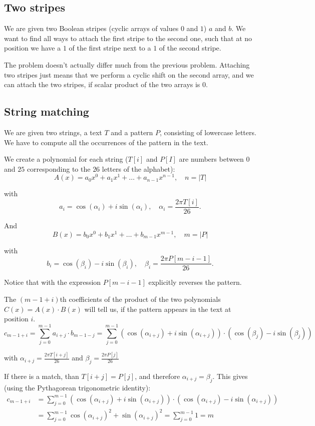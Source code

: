 \documentclass{report}
\begin{document}
\subsection{Two stripes}

We are given two Boolean stripes (cyclic arrays of values $0$ and $1$) $a$ and $b$. We want to find all ways to attach the first stripe to the second one, such that at no position we have a $1$ of the first stripe next to a $1$ of the second stripe.

The problem doesn't actually differ much from the previous problem. Attaching two stripes just means that we perform a cyclic shift on the second array, and we can attach the two stripes, if scalar product of the two arrays is $0$.

\subsection{String matching}

We are given two strings, a text $T$ and a pattern $P$, consisting of lowercase letters. We have to compute all the occurrences of the pattern in the text.

We create a polynomial for each string ($T[i]$ and $P[I]$ are numbers between $0$ and $25$ corresponding to the $26$ letters of the alphabet):
$$A(x) = a_0 x^0 + a_1 x^1 + \dots + a_{n-1} x^{n-1}, \quad n = |T|$$

with
$$a_i = \cos(\alpha_i) + i \sin(\alpha_i), \quad \alpha_i = \frac{2 \pi T[i]}{26}.$$

And
$$B(x) = b_0 x^0 + b_1 x^1 + \dots + b_{m-1} x^{m-1}, \quad m = |P|$$

with
$$b_i = \cos(\beta_i) - i \sin(\beta_i), \quad \beta_i = \frac{2 \pi P[m-i-1]}{26}.$$

Notice that with the expression $P[m-i-1]$ explicitly reverses the pattern.

The $(m-1+i)$th coefficients of the product of the two polynomials $C(x) = A(x) \cdot B(x)$ will tell us, if the pattern appears in the text at position $i$.
$$c_{m-1+i} = \sum_{j = 0}^{m-1} a_{i+j} \cdot b_{m-1-j} = \sum_{j=0}^{m-1} \left(\cos(\alpha_{i+j}) + i \sin(\alpha_{i+j})\right) \cdot \left(\cos(\beta_j) - i \sin(\beta_j)\right)$$

with $\alpha_{i+j} = \frac{2 \pi T[i+j]}{26}$ and $\beta_j = \frac{2 \pi P[j]}{26}$

If there is a match, than $T[i+j] = P[j]$, and therefore $\alpha_{i+j} = \beta_j$. This gives (using the Pythagorean trigonometric identity):
\[\begin{align} c_{m-1+i} &= \sum_{j = 0}^{m-1} \left(\cos(\alpha_{i+j}) + i \sin(\alpha_{i+j})\right) \cdot \left(\cos(\alpha_{i+j}) - i \sin(\alpha_{i+j})\right) \\ &= \sum_{j = 0}^{m-1} \cos(\alpha_{i+j})^2 + \sin(\alpha_{i+j})^2 = \sum_{j = 0}^{m-1} 1 = m \end{align}\]
\end{document}
